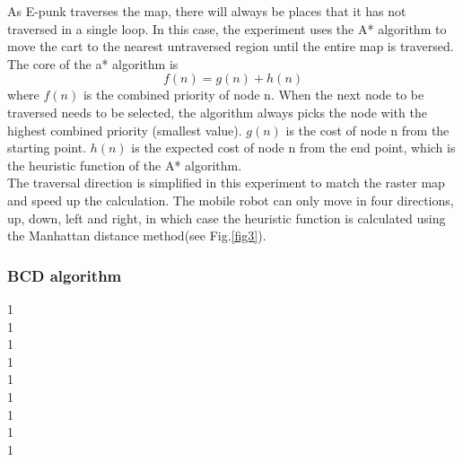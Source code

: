 \documentclass[conference]{IEEEtran}
\begin{document}
As E-punk traverses the map, there will always be places that it has not traversed in a single loop. In this case, the experiment uses the A* algorithm to move the cart to the nearest untraversed region until the entire map is traversed.\\
The core of the a* algorithm is
\begin{equation}
    f(n) = g(n) + h(n)
\end{equation}
where $f(n)$ is the combined priority of node n. When the next node to be traversed needs to be selected, the algorithm always picks the node with the highest combined priority (smallest value). $g(n)$ is the cost of node n from the starting point. $h(n)$ is the expected cost of node n from the end point, which is the heuristic function of the A* algorithm.\\
The traversal direction is simplified in this experiment to match the raster map and speed up the calculation. The mobile robot can only move in four directions, up, down, left and right, in which case the heuristic function is calculated using the Manhattan distance method(see Fig.\ref{fig3}).

\subsubsection{BCD algorithm}
1\\
1\\
1\\
1\\
1\\
1\\
1\\
1\\
1\\
\end{document}
